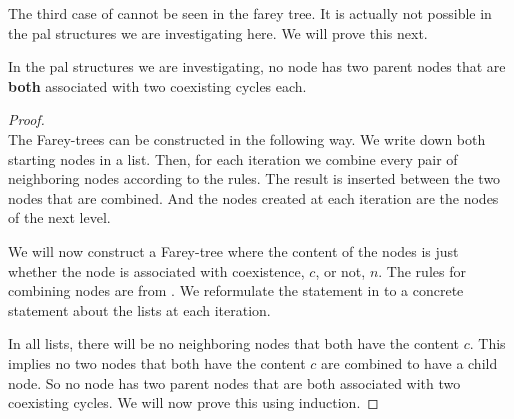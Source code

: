 The third case of  cannot be seen in the farey tree.
It is actually not possible in the \gls{pal} structures we are investigating here.
We will prove this next.

\begin{theorem}
	\label{theorem:no.parent.coex}
	In the \gls{pal} structures we are investigating, no node has two parent nodes that are \textbf{both} associated with two coexisting cycles each.
\end{theorem}

\begin{proof} \phantom{x} \\
	The Farey-trees can be constructed in the following way.
	We write down both starting nodes in a list.
	Then, for each iteration we combine every pair of neighboring nodes according to the rules.
	The result is inserted between the two nodes that are combined.
	And the nodes created at each iteration are the nodes of the next level.

	We will now construct a Farey-tree where the content of the nodes is just whether the node is associated with coexistence, $c$, or not, $n$.
	The rules for combining nodes are from .
	We reformulate the statement in  to a concrete statement about the lists at each iteration.

	In all lists, there will be no neighboring nodes that both have the content $c$.
	This implies no two nodes that both have the content $c$ are combined to have a child node.
	So no node has two parent nodes that are both associated with two coexisting cycles.
	We will now prove this using induction.


\end{proof}
